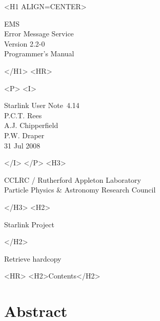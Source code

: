 \documentclass[twoside,11pt]{article}
\newcommand{\stardoccategory}  {Starlink User Note}
\newcommand{\stardocsource}    {sun\stardocnumber}
\newcommand{\stardocnumber}    {4.14}
\newcommand{\stardocauthors}   {P.C.T. Rees \\
                                A.J. Chipperfield \\
                                P.W. Draper}
\newcommand{\stardocdate}      {31 Jul 2008}
\newcommand{\stardoctitle}     {EMS \\ [\latex{1ex}]
                                Error Message Service}
\newcommand{\stardocversion}   {Version 2.2-0}
\newcommand{\stardocmanual}    {Programmer's Manual}
\newcommand{\htmladdnormallink}[2]{#1}
\newcommand{\htmladdimg}[1]{}
\newcommand{\htmlref}[2]{#1}
\newcommand{\htmladdtonavigation}[1]{}
\newcommand{\latex}[1]{#1}
\newcommand{\xlabel}[1]{}
\renewcommand{\_}{\texttt{\symbol{95}}}
\begin{document}
\begin{htmlonly}
   \xlabel{}
   \begin{rawhtml} <H1 ALIGN=CENTER> \end{rawhtml}
      \stardoctitle\\
      \stardocversion\\
      \stardocmanual
   \begin{rawhtml} </H1> <HR> \end{rawhtml}


   \begin{rawhtml} <P> <I> \end{rawhtml}
   \stardoccategory\ \stardocnumber \\
   \stardocauthors \\
   \stardocdate
   \begin{rawhtml} </I> </P> <H3> \end{rawhtml}
      \htmladdnormallink{CCLRC / Rutherford Appleton Laboratory}
                        {http://www.cclrc.ac.uk} \\
      \htmladdnormallink{Particle Physics \& Astronomy Research Council}
                        {http://www.pparc.ac.uk} \\
   \begin{rawhtml} </H3> <H2> \end{rawhtml}
      \htmladdnormallink{Starlink Project}{http://www.starlink.rl.ac.uk/}
   \begin{rawhtml} </H2> \end{rawhtml}
   \htmladdnormallink{\htmladdimg{source.gif} Retrieve hardcopy}
      {http://www.starlink.rl.ac.uk/cgi-bin/hcserver?\stardocsource}\\

  \label{stardoccontents}
  \begin{rawhtml} 
    <HR>
    <H2>Contents</H2>
  \end{rawhtml}
  \htmladdtonavigation{\htmlref{\htmladdimg{contents_motif.gif}}
        {stardoccontents}}

  \section{\xlabel{abstract}Abstract}
\end{htmlonly}
\end{document}
